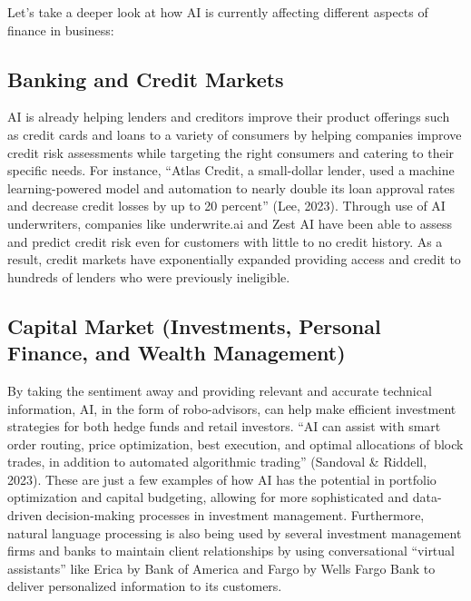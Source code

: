 \documentclass[
]{article}
\begin{document}
Let's take a deeper look at how AI is currently affecting different aspects of finance in business:

\hypertarget{banking-and-credit-markets}{%
\subsection{Banking and Credit Markets}\label{banking-and-credit-markets}}

AI is already helping lenders and creditors improve their product offerings such as credit cards and loans to a variety of consumers by helping companies improve credit risk assessments while targeting the right consumers and catering to their specific needs. For instance, ``Atlas Credit, a small-dollar lender, used a machine learning-powered model and automation to nearly double its loan approval rates and decrease credit losses by up to 20 percent'' (Lee, 2023). Through use of AI underwriters, companies like underwrite.ai and Zest AI have been able to assess and predict credit risk even for customers with little to no credit history. As a result, credit markets have exponentially expanded providing access and credit to hundreds of lenders who were previously ineligible.

\hypertarget{capital-market-investments-personal-finance-and-wealth-management}{%
\subsection{Capital Market (Investments, Personal Finance, and Wealth Management)}\label{capital-market-investments-personal-finance-and-wealth-management}}

By taking the sentiment away and providing relevant and accurate technical information, AI, in the form of robo-advisors, can help make efficient investment strategies for both hedge funds and retail investors. ``AI can assist with smart order routing, price optimization, best execution, and optimal allocations of block trades, in addition to automated algorithmic trading'' (Sandoval \& Riddell, 2023). These are just a few examples of how AI has the potential in portfolio optimization and capital budgeting, allowing for more sophisticated and data-driven decision-making processes in investment management. Furthermore, natural language processing is also being used by several investment management firms and banks to maintain client relationships by using conversational ``virtual assistants'' like Erica by Bank of America and Fargo by Wells Fargo Bank to deliver personalized information to its customers.
\end{document}

